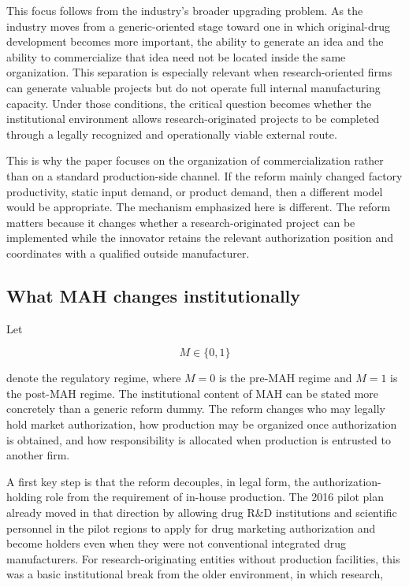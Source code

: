 \documentclass[12pt]{article}
\begin{document}
This focus follows from the industry's broader upgrading problem. As the industry moves from a generic-oriented stage toward one in which original-drug development becomes more important, the ability to generate an idea and the ability to commercialize that idea need not be located inside the same organization. This separation is especially relevant when research-oriented firms can generate valuable projects but do not operate full internal manufacturing capacity. Under those conditions, the critical question becomes whether the institutional environment allows research-originated projects to be completed through a legally recognized and operationally viable external route.

This is why the paper focuses on the organization of commercialization rather than on a standard production-side channel. If the reform mainly changed factory productivity, static input demand, or product demand, then a different model would be appropriate. The mechanism emphasized here is different. The reform matters because it changes whether a research-originated project can be implemented while the innovator retains the relevant authorization position and coordinates with a qualified outside manufacturer.

\subsection{What MAH changes institutionally}

Let

\[
M \in \{0,1\}
\]

denote the regulatory regime, where $M = 0$ is the pre-MAH regime and $M = 1$ is the post-MAH regime. The institutional content of MAH can be stated more concretely than a generic reform dummy. The reform changes who may legally hold market authorization, how production may be organized once authorization is obtained, and how responsibility is allocated when production is entrusted to another firm.

A first key step is that the reform decouples, in legal form, the authorization-holding role from the requirement of in-house production. The 2016 pilot plan already moved in that direction by allowing drug R\&D institutions and scientific personnel in the pilot regions to apply for drug marketing authorization and become holders even when they were not conventional integrated drug manufacturers. For research-originating entities without production facilities, this was a basic institutional break from the older environment, in which research,
\end{document}
